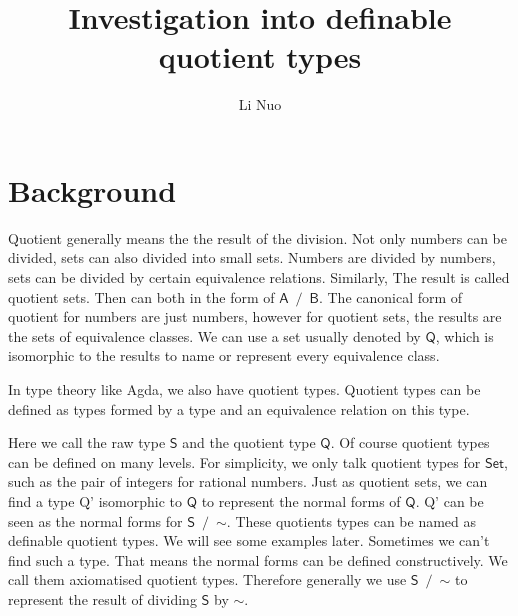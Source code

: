 \documentclass[a4paper,12pt]{article}
\author{Li Nuo}
\title{Investigation into definable quotient types}
\newcommand{\Conid}[1]{\mathit{#1}}
\newcommand{\Varid}[1]{\mathit{#1}}
\def\resethooks{%
  \global\let\SaveRestoreHook\empty
  \global\let\ColumnHook\empty}
\let\hspre\empty
\let\hspost\empty
\renewcommand\Varid[1]{\mathord{\textsf{#1}}}
\let\Conid\Varid
\begin{document}
\maketitle

\section{Background}
Quotient generally means the the result of the division. Not only numbers can
be divided, sets can also divided into small sets. Numbers are divided by numbers, sets can be
divided by certain equivalence relations. Similarly, The result is called quotient sets. Then can both in the form of \ensuremath{\Conid{A}\;\mathbin{/}\;\Conid{B}}. The canonical form of quotient for numbers are just numbers, however for quotient sets, the results are the sets of equivalence classes. We can use a set usually denoted by \ensuremath{\Conid{Q}}, which is isomorphic to the results to name or represent every equivalence class. 

In type theory like Agda, we also have quotient types. Quotient types can be defined as types formed by a type and an equivalence relation on this type.
\begin{hscode}\SaveRestoreHook
\column{B}{@{}>{\hspre}l<{\hspost}@{}}%
\column{E}{@{}>{\hspre}l<{\hspost}@{}}%
\>[B]{}\Conid{Q}\;\mathrel{=}\;\Conid{S/\char126 }{}\<[E]%
\ColumnHook
\end{hscode}\resethooks
Here we call the raw type \ensuremath{\Conid{S}} and the quotient type  \ensuremath{\Conid{Q}}. Of course quotient types can be defined on many levels. For simplicity, we only talk quotient types for \ensuremath{\Conid{Set}}, such as the pair of integers for rational numbers. Just as quotient sets, we can find a type \ensuremath{\Conid{Q'}} isomorphic to \ensuremath{\Conid{Q}} to represent  the normal forms of \ensuremath{\Conid{Q}}. 
\ensuremath{\Conid{Q'}} can be seen as the normal forms for \ensuremath{\Conid{S}\;\mathbin{/}\;\mathord{\sim}}. These quotients types can be named as definable quotient types. We will see some examples later.
Sometimes we can't find such a type. That means the normal forms can be defined constructively. We call them axiomatised quotient types. Therefore generally we use \ensuremath{\Conid{S}\;\mathbin{/}\;\mathord{\sim}} to represent the result of dividing \ensuremath{\Conid{S}} by \ensuremath{\mathord{\sim}}.
\end{document}
